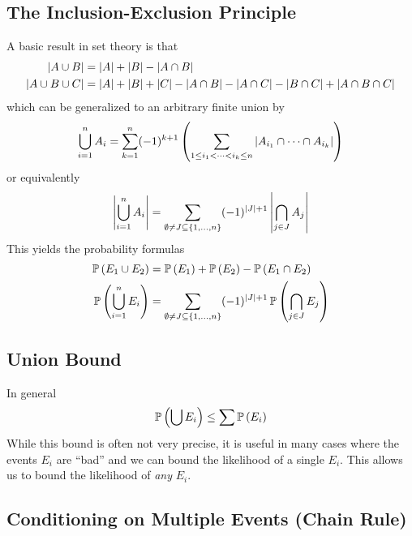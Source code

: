 \subsection{The Inclusion-Exclusion Principle}
A basic result in set theory is that
\begin{align*}
    \left\lvert A \cup B\right\rvert &= \left\lvert A\right\rvert + \left\lvert B\right\rvert - \left\lvert A \cap B\right\rvert\\
    \left\lvert A \cup B \cup C\right\rvert &= \left\lvert A\right\rvert + \left\lvert B\right\rvert + \left\lvert C\right\rvert - \left\lvert A \cap B\right\rvert - \left\lvert A \cap C\right\rvert - \left\lvert B \cap C\right\rvert + \left\lvert A \cap B \cap C\right\rvert
\end{align*}
which can be generalized to an arbitrary finite union by
\[\bigcup_{i=1}^n A_i = \sum_{k=1}^n (-1)^{k+1} \left(\sum_{1 \leq i_1 < \dots < i_k \leq n} \left\lvert A_{i_1} \cap \cdots \cap A_{i_k}\right\rvert \right)\]
or equivalently
\[\left\lvert\bigcup_{i=1}^n A_i\right\rvert = \sum_{\emptyset \neq J \subseteq \left\lbrace1,\dots,n\right\rbrace}
(-1)^{\left\lvert J\right\rvert+1} \left\lvert\bigcap_{j\in J} A_j\right\rvert\]
This yields the probability formulas
\begin{align*}
    \operatorname{\mathbb{P}}\left(E_1 \cup E_2\right) &= \operatorname{\mathbb{P}}\left(E_1\right) + \operatorname{\mathbb{P}}\left(E_2\right) - \operatorname{\mathbb{P}}\left(E_1 \cap E_2\right)\\
    \operatorname{\mathbb{P}}\left(\bigcup_{i=1}^n E_i\right) &= \sum_{\emptyset \neq J \subseteq \left\lbrace1,\dots,n\right\rbrace}
(-1)^{\left\lvert J\right\rvert+1} \operatorname{\mathbb{P}}\left(\bigcap_{j\in J} E_j\right)
\end{align*}

\subsection{Union Bound}
In general
\[\operatorname{\mathbb{P}}\left(\bigcup E_i\right) \leq \sum\operatorname{\mathbb{P}}\left(E_i\right)\]
While this bound is often not very precise, it is useful in many cases where the
events $E_i$ are ``bad'' and we can bound the likelihood of a single $E_i$. This
allows us to bound the likelihood of \emph{any} $E_i$. 

\subsection{Conditioning on Multiple Events (Chain Rule)}
